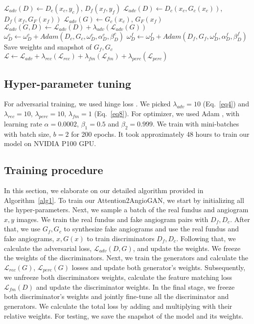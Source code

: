 \documentclass[a4paper,conference]{IEEEtran}
\begin{document}
\begin{algorithm}[h]
\begin{algorithmic}[1]
    \STATE $\mathcal{L}_{adv}(D) \gets D_{c}(x_{c},y_{c})$, $D_{f}(x_{f},y_{f})$  
    \STATE $\mathcal{L}_{adv}(D) \gets D_{c}(x_{c},G_{c}(x_{c}))$, $D_{f}(x_{f},G_{F}(x_{f}))$  
    \STATE $\mathcal{L}_{adv}(G) \gets G_{c}(x_{c})$, $G_{F}(x_{f})$
    \STATE $\mathcal{L}_{adv}(G,D) \gets \mathcal{L}_{adv}(D) + \lambda_{adv}(\mathcal{L}_{adv}(G))$
    \STATE $\omega^c_{D} \gets \omega^c_{D}+ Adam(D_c,G_c,\omega^c_{D},\alpha^c_{D},\beta^c_{D})$
    \STATE $\omega^f_{D} \gets \omega^f_{D}+ Adam(D_f,G_f,\omega^f_{D},\alpha^f_{D},\beta^f_{D})$
    \STATE Save weights and snapshot of $G_{f},G_{c}$
    \STATE $\mathcal{L} \gets \mathcal{L}_{adv} +  \lambda_{rec}(\mathcal{L}_{rec}) + \lambda_{fm}(\mathcal{L}_{fm}) + \lambda_{perc}(\mathcal{L}_{perc}) $
  \ENDFOR
\end{algorithmic}
\end{algorithm}



\subsection{Hyper-parameter tuning}
\label{subsec:hyper}
For adversarial training, we used hinge loss \cite{zhang2019self,lim2017geometric}. We picked $\lambda_{adv}=10$ (Eq.~\ref{eq4}) and $ \lambda_{rec} =10$, $ \lambda_{perc} =10$, $ \lambda_{fm} =1$ (Eq.~\ref{eq8}). For optimizer, we used Adam \cite{kingma2014adam}, with learning rate $\alpha=0.0002$, $\beta_1=0.5$ and $\beta_2=0.999$. We train with mini-batches with batch size, $b=2$ for 200 epochs. It took approximately 48 hours to train our model on NVIDIA P100 GPU.




\subsection{Training procedure}
\label{subsec:training}
In this section, we elaborate on our detailed algorithm provided in Algorithm~\ref{alg1}. To train our Attention2AngioGAN, we start by initializing all the hyper-parameters. Next, we sample a batch of the real fundus and angiogram $x,y$ images. We train the real fundus and fake angiogram pairs with $D_{f}, D_{c}$. After that, we use $G_{f}, G_{c}$ to synthesize fake angiograms and use the real fundus and fake angiograms, $x,G(x)$ to train discriminators $D_{f},D_{c}$. Following that, we calculate the adversarial loss, $\mathcal{L}_{adv}(D, G)$, and update the weights. We freeze the weights of the discriminators. Next, we train the generators and calculate the $\mathcal{L}_{rec}(G)$, $\mathcal{L}_{perc}(G)$ losses and update both generator's weights.  Subsequently, we unfreeze both discriminators weights, calculate the feature matching loss $\mathcal{L}_{fm}(D)$  and update the discriminator weights. In the final stage, we freeze both discriminator's weights and jointly fine-tune all the discriminator and generators. We calculate the total loss by adding and multiplying with their relative weights. For testing, we save the snapshot of the model and its weights.
\end{document}
